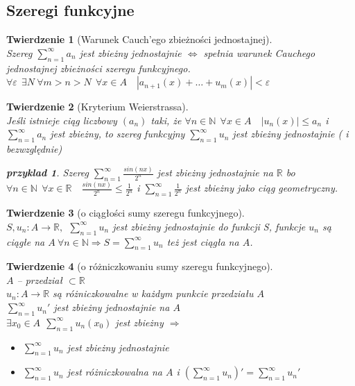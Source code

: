 \documentclass[12pt,a4paper]{article}
\newtheorem{tw}{Twierdzenie}
\newtheorem{przyklad}{przyklad}
\theoremstyle{definition}
\begin{document}
\subsection{Szeregi funkcyjne}
\begin{tw}[Warunek Cauch'ego zbieżności jednostajnej]~\\
Szereg $\sum\limits_{n=1}^\infty a_n$ jest zbieżny jednostajnie $\Leftrightarrow$ spełnia warunek Cauchego jednostajnej zbieżności szeregu funkcyjnego.
$\forall \varepsilon ~~\exists N ~ \forall m>n>N ~~ \forall x\in A \quad |a_{n+1}(x) + \dots + u_m(x)| < \varepsilon $
\end{tw}

\begin{tw}[Kryterium Weierstrassa]~\\
Jeśli istnieje ciąg liczbowy $(a_n)$ taki, że $\forall n\in \mathbb{N} ~~ \forall x\in A \quad |u_n(x)|\leqslant a_n$ i $\sum\limits_{n=1}^\infty a_n$ jest zbieżny, to szereg funkcyjny $\sum\limits_{n=1}^\infty u_n$ jest zbieżny jednostajnie ( i bezwzględnie)
\begin{przyklad}
Szereg $\sum\limits_{n=1}^\infty \frac{sin(nx)}{2^n}$ jest zbieżny jednostajnie na $\mathbb{R}$ bo
$\forall n\in \mathbb{N} ~~ \forall x\in\mathbb{R} \quad \frac{sin(nx)}{2^n} \leqslant \frac{1}{2^n} $ i $\sum\limits_{n=1}^\infty \frac{1}{2^n}$ jest zbieżny jako ciąg geometryczny.
\end{przyklad}
\end{tw}

\begin{tw}[o ciągłości sumy szeregu funkcyjnego]~\\
$S, u_n: A \to \mathbb{R}, ~~ \sum\limits_{n=1}^\infty u_n$ jest zbieżny jednostajnie do funkcji S, funkcje $u_n$ są ciągłe na $A~ \forall n\in\mathbb{N} \Rightarrow S=\sum\limits_{n=1}^\infty u_n$ też jest ciągła na $A$.
\end{tw}

\begin{tw}[o różniczkowaniu sumy szeregu funkcyjnego]~\\
$A$ -- przedział $\subset \mathbb{R}$\\
$u_n: A \to \mathbb{R}$ są różniczkowalne w każdym punkcie przedziału $A$\\
$\sum\limits_{n=1}^\infty u_n'$ jest zbieżny jednostajnie na $A$\\
$\exists x_0\in A ~~ \sum\limits_{n=1}^\infty u_n(x_0)$ jest zbieżny $\Rightarrow$
\begin{itemize}
	\item $\sum\limits_{n=1}^\infty u_n$ jest zbieżny jednostajnie
	\item $\sum\limits_{n=1}^\infty u_n$ jest różniczkowalna na $A$ i $(\sum\limits_{n=1}^\infty u_n)' = \sum\limits_{n=1}^\infty u_n'$
\end{itemize}
\end{tw}
\end{document}
